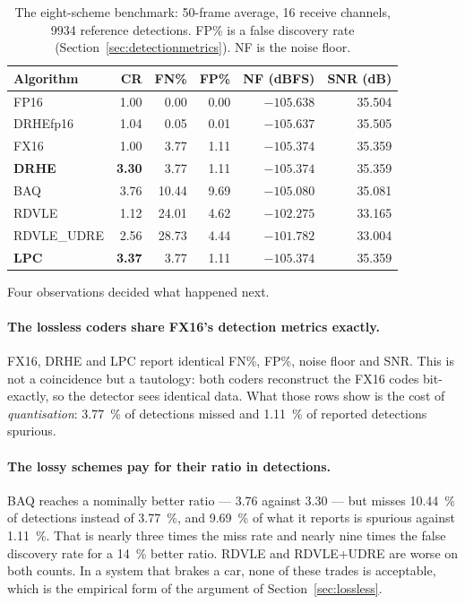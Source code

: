 \begin{table}[htbp]
\centering
\caption[The eight-scheme benchmark]{The eight-scheme benchmark: 50-frame
average, 16 receive channels, \num{9934} reference detections. FP\% is a false
discovery rate (Section~\ref{sec:detectionmetrics}). NF is the noise floor.}
\label{tab:phase1}
\small
\begin{tabular}{@{}lrrrrr@{}}
\toprule
Algorithm & CR & FN\% & FP\% & NF (dBFS) & SNR (dB)\\
\midrule
FP16          & 1.00 & 0.00  & 0.00 & $-105.638$ & 35.504\\
DRHEfp16      & 1.04 & 0.05  & 0.01 & $-105.637$ & 35.505\\
FX16          & 1.00 & 3.77  & 1.11 & $-105.374$ & 35.359\\
\textbf{DRHE} & \textbf{3.30} & 3.77 & 1.11 & $-105.374$ & 35.359\\
BAQ           & 3.76 & 10.44 & 9.69 & $-105.080$ & 35.081\\
RDVLE         & 1.12 & 24.01 & 4.62 & $-102.275$ & 33.165\\
RDVLE\_UDRE   & 2.56 & 28.73 & 4.44 & $-101.782$ & 33.004\\
\textbf{LPC}  & \textbf{3.37} & 3.77 & 1.11 & $-105.374$ & 35.359\\
\bottomrule
\end{tabular}
\end{table}

Four observations decided what happened next.

\paragraph{The lossless coders share FX16's detection metrics exactly.}
FX16, DRHE and LPC report identical FN\%, FP\%, noise floor and SNR. This is not
a coincidence but a tautology: both coders reconstruct the FX16 codes
bit-exactly, so the detector sees identical data. What those rows show is the
cost of \emph{quantisation}: \SI{3.77}{\percent} of detections missed and
\SI{1.11}{\percent} of reported detections spurious.

\paragraph{The lossy schemes pay for their ratio in detections.}
BAQ reaches a nominally better ratio --- \num{3.76} against \num{3.30} --- but
misses \SI{10.44}{\percent} of detections instead of \SI{3.77}{\percent}, and
\SI{9.69}{\percent} of what it reports is spurious against \SI{1.11}{\percent}.
That is nearly three times the miss rate and nearly nine times the false
discovery rate for a \SI{14}{\percent} better ratio. RDVLE and RDVLE+UDRE are
worse on both counts. In a system that brakes a car, none of these trades is
acceptable, which is the empirical form of the argument of
Section~\ref{sec:lossless}.

